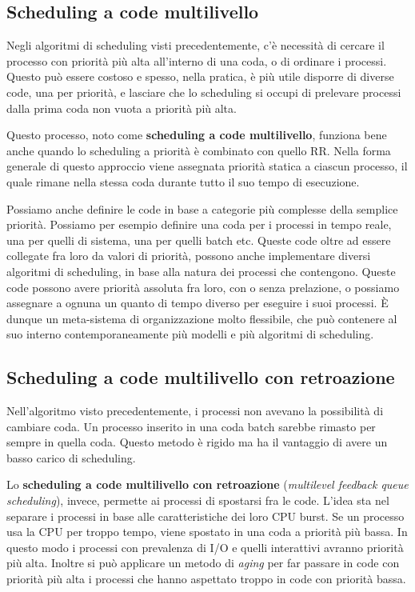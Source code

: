     \subsection{Scheduling a code multilivello}
        Negli algoritmi di scheduling visti precedentemente, c'è necessità di cercare il processo con priorità più alta all'interno di una coda, o di ordinare i processi. Questo può essere costoso e spesso, nella pratica, è più utile disporre di diverse code, una per priorità, e lasciare che lo scheduling si occupi di prelevare processi dalla prima coda non vuota a priorità più alta.
        
        Questo processo, noto come \textbf{scheduling a code multilivello}, funziona bene anche quando lo scheduling a priorità è combinato con quello RR. Nella forma generale di questo approccio viene assegnata priorità statica a ciascun processo, il quale rimane nella stessa coda durante tutto il suo tempo di esecuzione.
        
        Possiamo anche definire le code in base a categorie più complesse della semplice priorità. Possiamo per esempio definire una coda per i processi in tempo reale, una per quelli di sistema, una per quelli batch etc. Queste code oltre ad essere collegate fra loro da valori di priorità, possono anche implementare diversi algoritmi di scheduling, in base alla natura dei processi che contengono. Queste code possono avere priorità assoluta fra loro, con o senza prelazione, o possiamo assegnare a ognuna un quanto di tempo diverso per eseguire i suoi processi. È dunque un meta-sistema di organizzazione molto flessibile, che può contenere al suo interno contemporaneamente più modelli e più algoritmi di scheduling.
        
    \subsection{Scheduling a code multilivello con retroazione}
        Nell'algoritmo visto precedentemente, i processi non avevano la possibilità di cambiare coda. Un processo inserito in una coda batch sarebbe rimasto per sempre in quella coda. Questo metodo è rigido ma ha il vantaggio di avere un basso carico di scheduling.
        
        Lo \textbf{scheduling a code multilivello con retroazione} (\textit{multilevel feedback queue scheduling}), invece, permette ai processi di spostarsi fra le code. L'idea sta nel separare i processi in base alle caratteristiche dei loro CPU burst. Se un processo usa la CPU per troppo tempo, viene spostato in una coda a priorità più bassa. In questo modo i processi con prevalenza di I/O e quelli interattivi avranno priorità più alta. Inoltre si può applicare un metodo di \textit{aging} per far passare in code con priorità più alta i processi che hanno aspettato troppo in code con priorità bassa.
        
